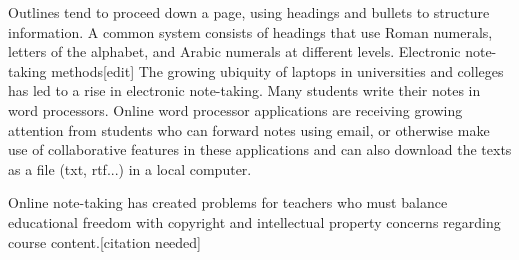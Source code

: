\documentclass[a4paper, 11pt]{article}
\begin{document}
\begin{CJK}{UTF8}{gbsn}
Outlines tend to proceed down a page, using headings and bullets to structure information. A common system consists of headings that use Roman numerals, letters of the alphabet, and Arabic numerals at different levels. 
Electronic note-taking methods[edit]
The growing ubiquity of laptops in universities and colleges has led to a rise in electronic note-taking. Many students write their notes in word processors. Online word processor applications are receiving growing attention from students who can forward notes using email, or otherwise make use of collaborative features in these applications and can also download the texts as a file (txt, rtf...) in a local computer.

Online note-taking has created problems for teachers who must balance educational freedom with copyright and intellectual property concerns regarding course content.[citation needed]


\end{CJK}
\end{document}
